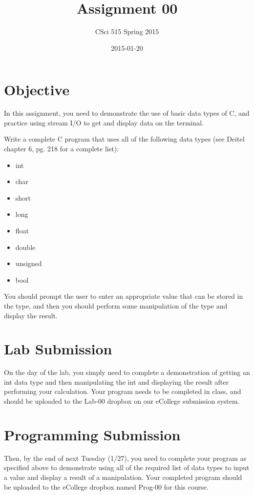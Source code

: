 \documentclass[11pt]{article}
\title{Assignment 00}
\author{CSci 515 Spring 2015}
\date{2015-01-20}
\begin{document}
\maketitle

\section*{Objective}
\label{sec-1}


In this assignment, you need to demonstrate the use of basic data
types of C, and practice using stream I/O to get and display data on
the terminal.

Write a complete C program that uses all of the following data types
(see Deitel chapter 6, pg. 218 for a complete list):

\begin{itemize}
\item int
\item char
\item short
\item long
\item float
\item double
\item unsigned
\item bool
\end{itemize}

You should prompt the user to enter an appropriate value that can be
stored in the type, and then you should perform some manipulation of
the type and display the result.
\section*{Lab Submission}
\label{sec-2}

On the day of the lab, you simply need to complete a demonstration of
getting an int data type and then manipulating the int and displaying
the result after performing your calculation.  Your program needs to
be completed in class, and should be uploaded to the Lab-00 dropbox on
our eCollege submission system.
\section*{Programming Submission}
\label{sec-3}

Then, by the end of next Tuesday (1/27), you need to complete your
program as specified above to demonstrate using all of the required
list of data types to input a value and display a result of a
manipulation.  Your completed program should be uploaded to the
eCollege dropbox named Prog-00 for this course.
\end{document}
